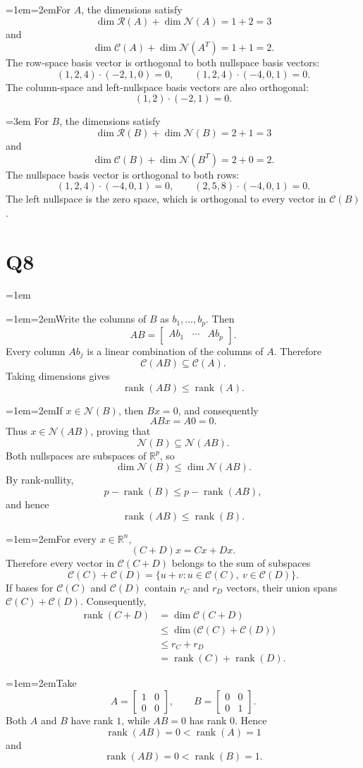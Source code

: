 \documentclass[11pt]{article}
\newcommand{\solutionquestion}[1]{\par\leftskip=0pt\section*{Q#1}\leftskip=1em}
\newcommand{\solutionpart}[1]{\par\smallskip\leftskip=1em\noindent\hangindent=2em\hangafter=1\makebox[1.5em][l]{\textbf{(#1)}}\hspace{0.5em}\ignorespaces}
\newcommand{\solutioncontinuation}{\par\leftskip=3em\noindent\ignorespaces}
\begin{document}
\solutionpart{iii}For $A$, the dimensions satisfy
\[
\dim\mathcal R(A)+\dim\mathcal N(A)=1+2=3
\]
and
\[
\dim\mathcal C(A)+\dim\mathcal N(A^{T})=1+1=2.
\]
The row-space basis vector is orthogonal to both nullspace basis vectors:
\[
(1,2,4)\cdot(-2,1,0)=0,
\qquad
(1,2,4)\cdot(-4,0,1)=0.
\]
The column-space and left-nullspace basis vectors are also orthogonal:
\[
(1,2)\cdot(-2,1)=0.
\]

\solutioncontinuation{} For $B$, the dimensions satisfy
\[
\dim\mathcal R(B)+\dim\mathcal N(B)=2+1=3
\]
and
\[
\dim\mathcal C(B)+\dim\mathcal N(B^{T})=2+0=2.
\]
The nullspace basis vector is orthogonal to both rows:
\[
(1,2,4)\cdot(-4,0,1)=0,
\qquad
(2,5,8)\cdot(-4,0,1)=0.
\]
The left nullspace is the zero space, which is orthogonal to every vector in $\mathcal C(B)$.

\solutionquestion{8}
\solutionpart{i}Write the columns of $B$ as $b_1,\ldots,b_p$. Then
\[
AB=\begin{bmatrix}Ab_1&\cdots&Ab_p\end{bmatrix}.
\]
Every column $Ab_j$ is a linear combination of the columns of $A$. Therefore
\[
\mathcal C(AB)\subseteq\mathcal C(A).
\]
Taking dimensions gives
\[
\operatorname{rank}(AB)\leq\operatorname{rank}(A).
\]

\solutionpart{ii}If $x\in\mathcal N(B)$, then $Bx=0$, and consequently
\[
ABx=A0=0.
\]
Thus $x\in\mathcal N(AB)$, proving that
\[
\mathcal N(B)\subseteq\mathcal N(AB).
\]
Both nullspaces are subspaces of $\mathbb R^p$, so
\[
\dim\mathcal N(B)\leq\dim\mathcal N(AB).
\]
By rank-nullity,
\[
p-\operatorname{rank}(B)
\leq p-\operatorname{rank}(AB),
\]
and hence
\[
\operatorname{rank}(AB)\leq\operatorname{rank}(B).
\]

\solutionpart{iii}For every $x\in\mathbb R^n$,
\[
(C+D)x=Cx+Dx.
\]
Therefore every vector in $\mathcal C(C+D)$ belongs to the sum of subspaces
\[
\mathcal C(C)+\mathcal C(D)
=\{u+v:u\in\mathcal C(C),\ v\in\mathcal C(D)\}.
\]
If bases for $\mathcal C(C)$ and $\mathcal C(D)$ contain $r_C$ and $r_D$ vectors, their union spans $\mathcal C(C)+\mathcal C(D)$. Consequently,
\[
\begin{aligned}
\operatorname{rank}(C+D)
&=\dim\mathcal C(C+D)\\
&\leq\dim\bigl(\mathcal C(C)+\mathcal C(D)\bigr)\\
&\leq r_C+r_D\\
&=\operatorname{rank}(C)+\operatorname{rank}(D).
\end{aligned}
\]

\solutionpart{iv}Take
\[
A=\begin{bmatrix}1&0\\0&0\end{bmatrix},
\qquad
B=\begin{bmatrix}0&0\\0&1\end{bmatrix}.
\]
Both $A$ and $B$ have rank $1$, while $AB=0$ has rank $0$. Hence
\[
\operatorname{rank}(AB)=0
<\operatorname{rank}(A)=1
\]
and
\[
\operatorname{rank}(AB)=0
<\operatorname{rank}(B)=1.
\]
\end{document}
